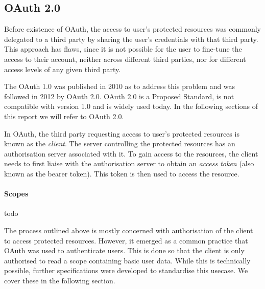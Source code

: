 \subsection{OAuth 2.0} \label{OAuth_2}

Before existence of OAuth, the access to user's protected resources was commonly delegated to a third party by sharing the user's credentials with that third party. This approach has flaws, since it is not possible for the user to fine-tune the access to their account, neither across different third parties, nor for different access levels of any given third party. 

The OAuth 1.0 was published in 2010 as to address this problem 
and was followed in 2012 by OAuth 2.0. 
OAuth 2.0 is a Proposed Standard, is not compatible with version 1.0 and is widely used today. In the following sections of this report we will refer to OAuth 2.0.

In OAuth, the third party requesting access to user's protected resources is known as the \textit{client}. The server controlling the protected resources has an authorisation server associated with it. To gain access to the resources, the client needs to first liaise with the authorisation server to obtain an \textit{access token} (also known as the bearer token). This token is then used to access the resource.



\paragraph{Scopes}
todo

The process outlined above is mostly concerned with authorisation of the client to access protected resources. However, it emerged as a common practice
that OAuth was used to authenticate users. This is done so that the client is only authorised to read a scope containing basic user data. While this is technically possible, further specifications were developed to standardise this usecase. We cover these in the following section.
